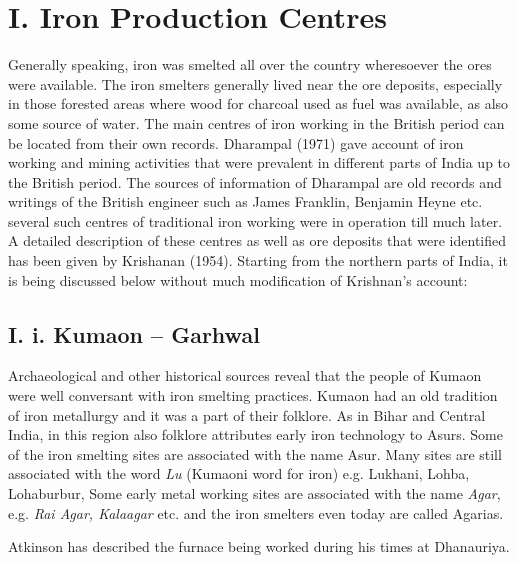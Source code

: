 \section*{I. Iron Production Centres}\label{section-1}

Generally speaking, iron was smelted all over the country wheresoever the ores were available.  The iron smelters generally lived near the ore deposits, especially in those forested areas where wood for charcoal used as fuel was available, as also some source of water. The main centres of iron working in the British period can be located from their own records. Dharampal (1971) gave account of iron working and mining activities that were prevalent in different parts of India up to the British period. The sources of information of Dharampal are old records and writings of the British engineer such as James Franklin, Benjamin Heyne etc. several such centres of traditional iron working were in operation till much later. A detailed description of these centres as well as ore deposits that were identified has been given by Krishanan (1954). Starting from the northern parts of India, it is being discussed below without much modification of Krishnan’s account:

\subsection*{I. i. Kumaon – Garhwal}\label{subsection-1}

Archaeological and other historical sources reveal that the people of Kumaon were well conversant with iron smelting practices. Kumaon had an old tradition of iron metallurgy and it was a part of their folklore. As in Bihar and Central India, in this region also folklore attributes early iron technology to Asurs. Some of the iron smelting sites are associated with the name Asur. Many sites are still associated with the word {\it Lu} (Kumaoni word for iron) e.g. Lukhani, Lohba, Lohaburbur, Some early metal working sites are associated with the name {\it Agar}, e.g. {\it Rai Agar, Kalaagar} etc. and the iron smelters even today are called Agarias.

Atkinson has described the furnace being worked during his times at Dhanauriya. 

